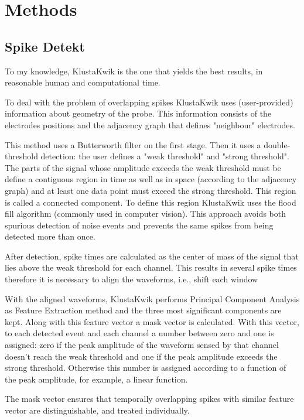 
\section{Methods}
\label{sec:methods}
\subsection{Spike Detekt}
\label{subsec:spikedetekt}

To my knowledge, KlustaKwik \cite{Rossant2016} is the one that yields the best results, in reasonable human and computational time. 

To deal with the problem of overlapping spikes KlustaKwik uses (user-provided) information about geometry of the probe. This information consists of the electrodes positions and the adjacency graph that defines "neighbour" electrodes. 

This method uses a Butterworth filter on the first stage. Then it uses a double-threshold detection: the user defines a "weak threshold" and "strong threshold". The parts of the signal whose amplitude exceeds the weak threshold must be define a contiguous region in time as well as in space (according to the adjacency graph) and at least one data point must exceed the strong threshold. This region is called a connected component. To define this region KlustaKwik uses the flood fill algorithm (commonly used in computer vision). This approach avoids both spurious detection of noise events and prevents the same spikes from being detected more than once.
 
After detection, spike times are calculated as the center of mass of the signal that lies above the weak threshold for each channel. This results in several spike times therefore it is necessary to align the waveforms, i.e., shift each window 

With the aligned waveforms, KlustaKwik performs Principal Component Analysis as Feature Extraction method and the three most significant components are kept. Along with this feature vector a mask vector is calculated. With this vector, to each detected event and each channel a number between zero and one is assigned: zero if the peak amplitude of the waveform sensed by that channel doesn't reach the weak threshold and one if the peak amplitude exceeds the strong threshold. Otherwise this number is assigned according to a function of the peak amplitude, for example, a linear function.

The mask vector ensures that temporally overlapping spikes with similar feature vector are distinguishable, and treated individually.

